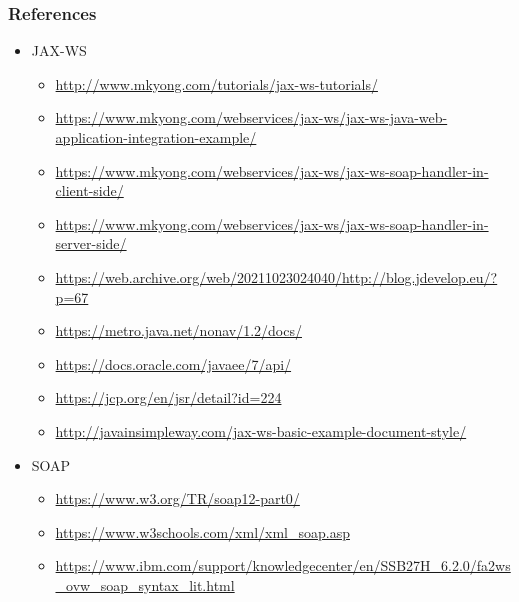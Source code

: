\documentclass[10pt,xcolor=pdflatex]{beamer}
\begin{document}
\begin{frame}[containsverbatim]\frametitle{References}
\begin{itemize}
	\item JAX-WS
      \begin{itemize}
    	\item \url{http://www.mkyong.com/tutorials/jax-ws-tutorials/}
        \item \url{https://www.mkyong.com/webservices/jax-ws/jax-ws-java-web-application-integration-example/}
        \item \url{https://www.mkyong.com/webservices/jax-ws/jax-ws-soap-handler-in-client-side/}
        \item \url{https://www.mkyong.com/webservices/jax-ws/jax-ws-soap-handler-in-server-side/}
        \item \url{https://web.archive.org/web/20211023024040/http://blog.jdevelop.eu/?p=67}
        \item \url{https://metro.java.net/nonav/1.2/docs/}
        \item \url{https://docs.oracle.com/javaee/7/api/}
        \item \url{https://jcp.org/en/jsr/detail?id=224}
        \item \url{http://javainsimpleway.com/jax-ws-basic-example-document-style/}
      \end{itemize}
    \item SOAP
      \begin{itemize}
    	\item \url{https://www.w3.org/TR/soap12-part0/}
        \item \url{https://www.w3schools.com/xml/xml_soap.asp}
        \item \url{https://www.ibm.com/support/knowledgecenter/en/SSB27H_6.2.0/fa2ws_ovw_soap_syntax_lit.html}
      \end{itemize}
\end{itemize}
\end{frame}


\end{document}
